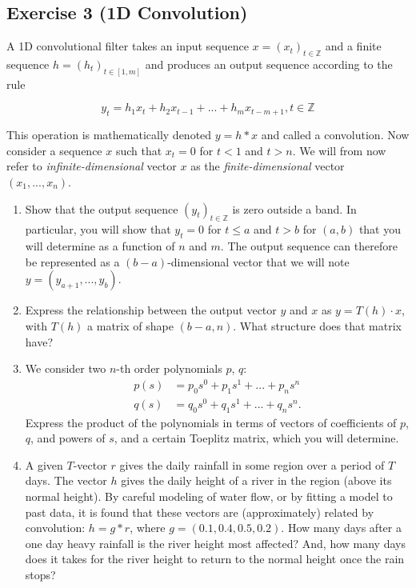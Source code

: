\documentclass[11pt]{article}
\begin{document}
\newpage
\subsection*{Exercise 3 (1D Convolution)}

A 1D convolutional filter takes an input sequence $x = (x_t)_{t \in \mathbb{Z}}$ and a finite sequence $h = (h_t)_{t \in [1, m]}$ and produces an output sequence according to the rule

\[y_t = h_1x_t + h_2x_{t-1} + ... + h_mx_{t-m+1},  t \in \mathbb{Z}\]

This operation is mathematically denoted $y = h * x$ and called a convolution. Now consider a sequence $x$ such that $x_t = 0$ for $t < 1$ and $t > n$. We will from now refer to \emph{infinite-dimensional} vector $x$ as the \emph{finite-dimensional} vector $(x_1, ..., x_n)$.

\begin{enumerate}
    \item Show that the output sequence $(y_t)_{t \in \mathbb{Z}}$ is zero outside a band. In particular, you will show that $y_t = 0$ for $t \leq a$ and $t > b$ for $(a, b)$ that you will determine as a function of $n$ and $m$. The output sequence can therefore be represented as a $(b-a)$-dimensional vector that we will note $y = (y_{a+1}, ..., y_{b})$.

    \item Express the relationship between the output vector $y$ and $x$ as $y = T(h) \cdot x$, with $T(h)$ a matrix of shape $(b-a, n)$. What structure does that matrix have?

    \item We consider two $n$-th order polynomials $p$, $q$:
    \begin{align*}
        p(s) &= p_0s^0 + p_1s^1 + ... + p_ns^n \\
        q(s) &= q_0s^0 + q_1s^1 + ... + q_ns^n.
    \end{align*}
    Express the product of the polynomials in terms of vectors of coefficients of $p$, $q$, and powers of $s$, and a certain Toeplitz matrix, which you will determine.

    \item A given $T$-vector $r$ gives the daily rainfall in some region over a period of $T$ days. The vector $h$ gives the daily height of a river in the region (above its normal height). By careful modeling of water flow, or by fitting a model to past data, it is found that these vectors are (approximately) related by convolution: $h=g*r$, where $g= (0.1,0.4,0.5,0.2)$. How  many days  after a  one day heavy rainfall is the river height most affected? And, how many days does it takes for the river height to return to the normal height once the rain stops?
\end{enumerate}
\end{document}
